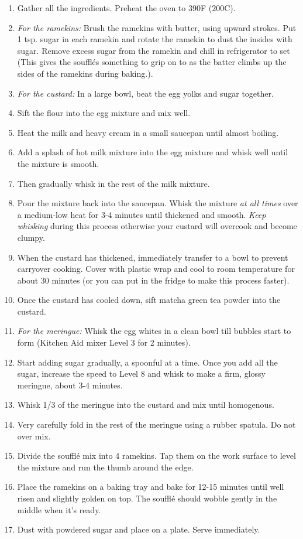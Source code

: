 \documentclass[12pt]{article}
\begin{document}
\begin{multicols*}{2}
\begin{enumerate}
    \item Gather all the ingredients. Preheat the oven to 390F (200C).
    \item \textit{For the ramekins:} Brush the ramekins with butter, using upward strokes. Put 1 tsp. sugar in each ramekin and rotate the ramekin to dust the insides with sugar. Remove excess sugar from the ramekin and chill in refrigerator to set (This gives the soufflés something to grip on to as the batter climbs up the sides of the ramekins during baking.).
    \item \textit{For the custard:} In a large bowl, beat the egg yolks and sugar together.
    \item Sift the flour into the egg mixture and mix well.
    \item Heat the milk and heavy cream in a small saucepan until almost boiling.
    \item Add a splash of hot milk mixture into the egg mixture and whisk well until the mixture is smooth.
    \item Then gradually whisk in the rest of the milk mixture.
    \item Pour the mixture back into the saucepan. Whisk the mixture \textit{at all times} over a medium-low heat for 3-4 minutes until thickened and smooth. \textit{Keep whisking} during this process otherwise your custard will overcook and become clumpy.
    \item When the custard has thickened, immediately transfer to a bowl to prevent carryover cooking. Cover with plastic wrap and cool to room temperature for about 30 minutes (or you can put in the fridge to make this process faster).
    \item Once the custard has cooled down, sift matcha green tea powder into the custard.
    \item \textit{For the meringue:} Whisk the egg whites in a clean bowl till bubbles start to form (Kitchen Aid mixer Level 3 for 2 minutes).
    \item Start adding sugar gradually, a spoonful at a time. Once you add all the sugar, increase the speed to Level 8 and whisk to make a firm, glossy meringue, about 3-4 minutes.
    \item Whisk 1/3 of the meringue into the custard and mix until homogenous.
    \item Very carefully fold in the rest of the meringue using a rubber spatula. Do not over mix.
    \item Divide the soufflé mix into 4 ramekins. Tap them on the work surface to level the mixture and run the thumb around the edge.
    \item Place the ramekins on a baking tray and bake for 12-15 minutes until well risen and slightly golden on top. The soufflé should wobble gently in the middle when it’s ready.
    \item Dust with powdered sugar and place on a plate. Serve immediately.
\end{enumerate}

\end{multicols*}
\end{document}
